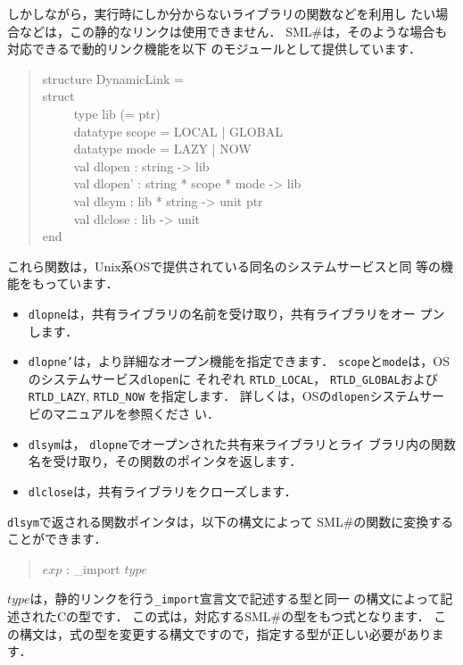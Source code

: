 \documentclass{jbook}
\newcommand{\smlsharp}{SML\#}
\newenvironment{program}{\begin{tt}\begin{quote}}{\end{quote}\end{tt}}
\newcommand{\myem}{\ \ \ \ \  }
\begin{document}
	しかしながら，実行時にしか分からないライブラリの関数などを利用し
たい場合などは，この静的なリンクは使用できません．
	\smlsharp{}は，そのような場合も対応できるで動的リンク機能を以下
のモジュールとして提供しています．
\begin{program}
structure DynamicLink =\\
struct\\
\myem  type lib (= ptr)\\
\myem  datatype scope = LOCAL | GLOBAL\\
\myem  datatype mode = LAZY | NOW\\
\myem  val dlopen : string -> lib\\
\myem  val dlopen' : string * scope * mode -> lib\\
\myem  val dlsym : lib * string -> unit ptr\\
\myem  val dlclose : lib -> unit\\
end
\end{program}
	これら関数は，Unix系OSで提供されている同名のシステムサービスと同
等の機能をもっています．
\begin{itemize}
\item  {\tt dlopne}は，共有ライブラリの名前を受け取り，共有ライブラリをオー
プンします．
\item  {\tt dlopne'}は，より詳細なオープン機能を指定できます．
	{\tt scope}と{\tt mode}は，OSのシステムサービス{\tt dlopen}に
それぞれ
{\tt RTLD\_LOCAL}，
{\tt RTLD\_GLOBAL}および
{\tt RTLD\_LAZY},
{\tt RTLD\_NOW}
を指定します．
	詳しくは，OSの{\tt dlopen}システムサービのマニュアルを参照くださ
い．
\item {\tt dlsym}は， {\tt dlopne}でオープンされた共有来ライブラリとライ
ブラリ内の関数名を受け取り，その関数のポインタを返します．
\item  {\tt dlclose}は，共有ライブラリをクローズします．
\end{itemize}
	{\tt dlsym}で返される関数ポインタは，以下の構文によって
\smlsharp{}の関数に変換することができます．
\begin{program}
$exp$ : \_import  $type$
\end{program}
	$type$は，静的リンクを行う{\tt \_import}宣言文で記述する型と同一
の構文によって記述されたCの型です．
	この式は，対応する\smlsharp{}の型をもつ式となります．
	この構文は，式の型を変更する構文ですので，指定する型が正しい必要があります．
\end{document}
